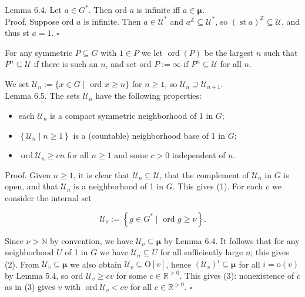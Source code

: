 \documentclass[10pt]{article}
\begin{document}
Lemma 6.4. Let $a \in G^{*}$. Then ord $a$ is infinite iff $a \in \boldsymbol{\mu}$.\\
Proof. Suppose ord $a$ is infinite. Then $a \in \mathcal{U}^{*}$ and $a^{\mathbb{Z}} \subseteq \mathcal{U}^{*}$, so $(\operatorname{st} a)^{\mathbb{Z}} \subseteq \mathcal{U}$, and thus st $a=1$. \(\square\)

For any symmetric $P \subseteq G$ with $1 \in P$ we let $\operatorname{ord}(P)$ be the largest $n$ such that $P^{n} \subseteq \mathcal{U}$ if there is such an $n$, and set ord $P:=\infty$ if $P^{n} \subseteq \mathcal{U}$ for all $n$.

We set $\mathcal{U}_{n}:=\{x \in G \mid$ ord $x \geq n\}$ for $n \geq 1$, so $\mathcal{U}_{n} \supseteq \mathcal{U}_{n+1}$.\\
Lemma 6.5. The sets $\mathcal{U}_{n}$ have the following properties:

\begin{itemize}
  \item[(1)] each $\mathcal{U}_{n}$ is a compact symmetric neighborhood of 1 in $G$;
  \item[(2)] $\left\{\mathcal{U}_{n} \mid n \geq 1\right\}$ is a (countable) neighborhood base of 1 in $G$;
  \item[(3)] $\operatorname{ord} \mathcal{U}_{n} \geq c n$ for all $n \geq 1$ and some $c>0$ independent of $n$.
\end{itemize}

Proof. Given $n \geq 1$, it is clear that $\mathcal{U}_{n} \subseteq \mathcal{U}$, that the complement of $\mathcal{U}_{n}$ in $G$ is open, and that $\mathcal{U}_{n}$ is a neighborhood of 1 in $G$. This gives (1). For each $v$ we consider the internal set

$$
\mathcal{U}_{\nu}:=\left\{g \in G^{*} \mid \text { ord } g \geq \nu\right\} .
$$

Since $\nu>\mathbb{N}$ by convention, we have $\mathcal{U}_{\nu} \subseteq \boldsymbol{\mu}$ by Lemma 6.4. It follows that for any neighborhood $U$ of 1 in $G$ we have $\mathcal{U}_{n} \subseteq U$ for all sufficiently large $n$; this gives (2). From $\mathcal{U}_{v} \subseteq \boldsymbol{\mu}$ we also obtain $\mathcal{U}_{v} \subseteq \mathrm{O}[v]$, hence $\left(\mathcal{U}_{v}\right)^{i} \subseteq \boldsymbol{\mu}$ for all $i=\mathrm{o}(v)$ by Lemma 5.4, so ord $\mathcal{U}_{v} \geq c v$ for some $c \in \mathbb{R}^{>0}$. This gives (3): nonexistence of $c$ as in (3) gives $v$ with $\operatorname{ord} \mathcal{U}_{v}<c v$ for all $c \in \mathbb{R}^{>0}$. \(\square\)
\end{document}
